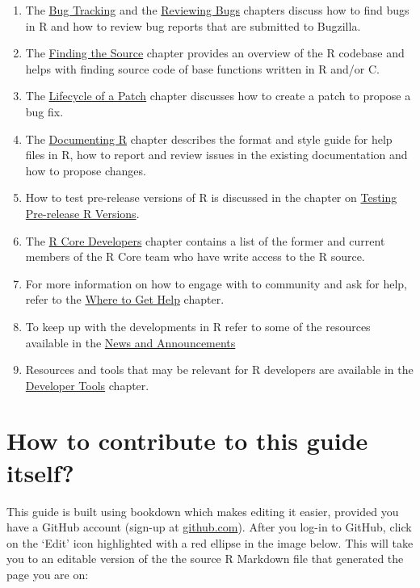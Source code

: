 \documentclass[
]{book}
\begin{document}
\begin{enumerate}
\def\labelenumi{\arabic{enumi}.}
\setcounter{enumi}{1}
\item
  The \hyperref[BugTrack]{Bug Tracking} and the \hyperref[ReviewBugs]{Reviewing Bugs} chapters discuss how to find bugs in R and how to review bug reports that are submitted to Bugzilla.
\item
  The \hyperref[FindSource]{Finding the Source} chapter provides an overview of the R codebase and helps with finding source code of base functions written in R and/or C.
\item
  The \hyperref[FixBug]{Lifecycle of a Patch} chapter discusses how to create a patch to propose a bug fix.
\item
  The \hyperref[Doc]{Documenting R} chapter describes the format and style guide for help files in R, how to report and review issues in the existing documentation and how to propose changes.
\item
  How to test pre-release versions of R is discussed in the chapter on \hyperref[TestRVer]{Testing Pre-release R Versions}.
\item
  The \hyperref[CoreDev]{R Core Developers} chapter contains a list of the former and current members of the R Core team who have write access to the R source.
\item
  For more information on how to engage with to community and ask for help, refer to the \hyperref[WhereToGetHelp]{Where to Get Help} chapter.
\item
  To keep up with the developments in R refer to some of the resources available in the \hyperref[News]{News and Announcements}
\item
  Resources and tools that may be relevant for R developers are available in the \hyperref[DevTools]{Developer Tools} chapter.
\end{enumerate}

\section{How to contribute to this guide itself?}\label{how-to-contribute-to-this-guide}

This guide is built using bookdown which makes editing it easier, provided you have a GitHub account (sign-up at \href{https://github.com/}{github.com}). After you log-in to GitHub, click on the `Edit' icon highlighted with a red ellipse in the image below. This will take you to an editable version of the the source R Markdown file that generated the page you are on:
\end{document}
